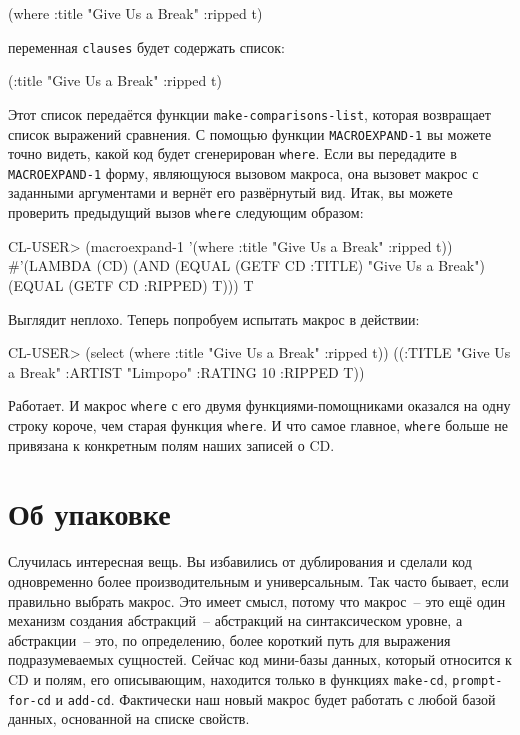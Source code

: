 \begin{myverb}
(where :title "Give Us a Break" :ripped t)
\end{myverb}

\noindent{}переменная \lstinline{clauses} будет содержать список:

\begin{myverb}
(:title "Give Us a Break" :ripped t)
\end{myverb}

Этот список передаётся функции \lstinline{make-comparisons-list}, которая возвращает список
выражений сравнения. С помощью функции \lstinline{MACROEXPAND-1} вы можете точно видеть,
какой код будет сгенерирован \lstinline{where}. Если вы передадите в \lstinline{MACROEXPAND-1}
форму, являющуюся вызовом макроса, она вызовет макрос с заданными аргументами и вернёт его
развёрнутый вид. Итак, вы можете проверить предыдущий вызов \lstinline{where} следующим
образом:

\begin{myverb}
CL-USER> (macroexpand-1 '(where :title "Give Us a Break" :ripped t))
#'(LAMBDA (CD)
    (AND (EQUAL (GETF CD :TITLE) "Give Us a Break")
         (EQUAL (GETF CD :RIPPED) T)))
T
\end{myverb}

Выглядит неплохо. Теперь попробуем испытать макрос в действии:

\begin{myverb}
CL-USER> (select (where :title "Give Us a Break" :ripped t))
((:TITLE "Give Us a Break" :ARTIST "Limpopo" :RATING 10 :RIPPED T))
\end{myverb}

Работает. И макрос \lstinline{where} с его двумя функциями-помощниками оказался на одну строку
короче, чем старая функция \lstinline{where}. И что самое главное, \lstinline{where} больше не
привязана к конкретным полям наших записей о CD.

\section{Об упаковке}

Случилась интересная вещь. Вы избавились от дублирования и сделали код одновременно более
производительным и универсальным. Так часто бывает, если правильно выбрать макрос. Это
имеет смысл, потому что макрос~-- это ещё один механизм создания абстракций~--
абстракций на синтаксическом уровне, а абстракции~-- это, по определению, более короткий
путь для выражения подразумеваемых сущностей. Сейчас код мини-базы данных, который
относится к CD и полям, его описывающим, находится только в функциях \lstinline{make-cd},
\lstinline{prompt-for-cd} и \lstinline{add-cd}. Фактически наш новый макрос будет работать с любой
базой данных, основанной на списке свойств.


